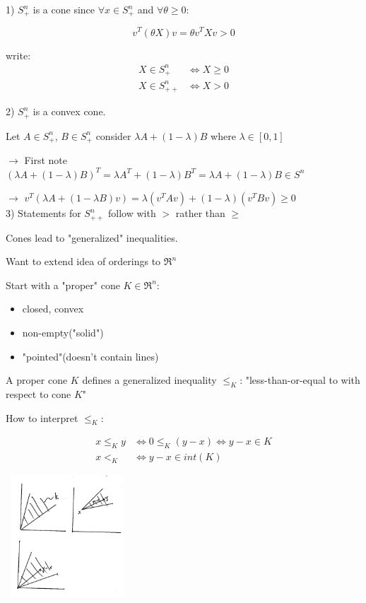 1) $S_+^n$ is a cone since $\forall x \in S_+^n$ and $\forall \theta \geq 0$:

\begin{equation*}
v^T(\theta X)v = \theta v^TXv  > 0
\end{equation*}

write:
\begin{align*}
X\in S^n_+ &\Leftrightarrow X\geq 0\\
X\in S^n_{++} &\Leftrightarrow X> 0
\end{align*}

2) $S_+^n$ is a convex cone.

Let $A\in S^n_+$, $B\in S^n_+$ consider $\lambda A + (1-\lambda)B$ where $\lambda \in [0,1]$

$\rightarrow$ First note $(\lambda A + (1-\lambda)B)^T= \lambda A^T + (1-\lambda)B^T = \lambda A + (1-\lambda)B \in S^n$


$\rightarrow$ $v^T(\lambda A + (1-\lambda B)v) =\lambda(v^TAv) + (1-\lambda)(v^TBv)\geq 0$\\
 
3) Statements for $S^n_{++}$ follow with $>$ rather than $\geq$

Cones lead to "generalized" inequalities.

Want to extend idea of orderings to $\Re^n$

Start with a "proper" cone $K\in \Re^n$:
\begin{itemize}
	\item closed, convex
	
	\item non-empty("solid")
	
	\item "pointed"(doesn't contain lines)
\end{itemize}


A proper cone $K$ defines a generalized inequality $\leq_K$: "less-than-or-equal to with respect to cone $K$"

How to interpret $\leq_K$:

\begin{align*}
x\leq_K y &\Leftrightarrow 0\leq_K (y-x)\Leftrightarrow y - x \in K\\
x <_K &\Leftrightarrow y-x\in int(K)
\end{align*}

\begin{marginfigure}
	\centering
	\includegraphics[width=1.8in,height=1.8in]{figures/ch08/figure1030_1.png}
\end{marginfigure}


